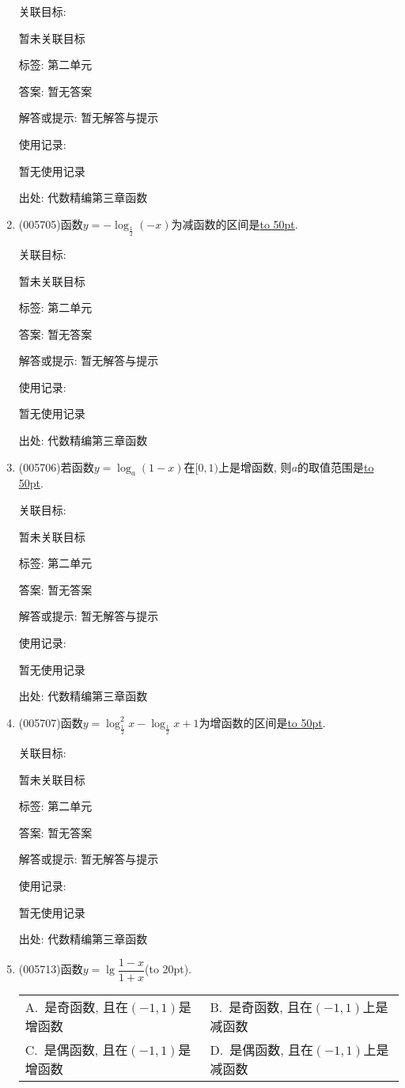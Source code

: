 \documentclass[10pt,a4paper]{article}
\newcommand{\blank}[1]{\underline{\hbox to #1pt{}}}
\newcommand{\bracket}[1]{(\hbox to #1pt{})}
\newcommand{\twoch}[4]{\par\begin{tabular}{p{.46\textwidth}p{.46\textwidth}}
A.~#1& B.~#2\\
C.~#3& D.~#4
\end{tabular}}
\begin{document}
\begin{enumerate}[1.]
关联目标:

暂未关联目标



标签: 第二单元

答案: 暂无答案

解答或提示: 暂无解答与提示

使用记录:

暂无使用记录


出处: 代数精编第三章函数
\item { (005705)}函数$y=-\log_{\frac 12}(-x)$为减函数的区间是\blank{50}.


关联目标:

暂未关联目标



标签: 第二单元

答案: 暂无答案

解答或提示: 暂无解答与提示

使用记录:

暂无使用记录


出处: 代数精编第三章函数
\item { (005706)}若函数$y=\log_a(1-x)$在$[0,1)$上是增函数, 则$a$的取值范围是\blank{50}.


关联目标:

暂未关联目标



标签: 第二单元

答案: 暂无答案

解答或提示: 暂无解答与提示

使用记录:

暂无使用记录


出处: 代数精编第三章函数
\item { (005707)}函数$y=\log_{\frac 12}^2x-\log_{\frac 12}x+1$为增函数的区间是\blank{50}.


关联目标:

暂未关联目标



标签: 第二单元

答案: 暂无答案

解答或提示: 暂无解答与提示

使用记录:

暂无使用记录


出处: 代数精编第三章函数
\item { (005713)}函数$y=\lg \dfrac{1-x}{1+x}$\bracket{20}.
\twoch{是奇函数, 且在$(-1, 1)$是增函数}{是奇函数, 且在$(-1, 1)$上是减函数}{是偶函数, 且在$(-1, 1)$是增函数}{是偶函数, 且在$(-1, 1)$上是减函数}



\end{enumerate}
\end{document}
